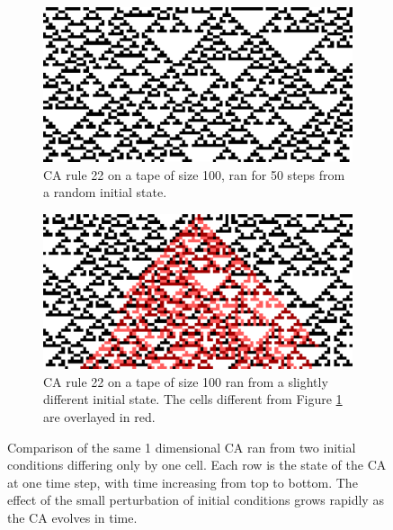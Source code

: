 \begin{figure}[htbp]
\begin{subfigure}[t]{.04\linewidth}
    \caption*{}
  \end{subfigure}
  \begin{subfigure}[t]{.45\linewidth}
    \centering
    \includegraphics[width=.93\linewidth]{figures/ca_comp_a}
    \caption{\ac{CA} rule 22 on a tape of size 100, ran for 50 steps from a
      random initial state.}
    \label{fig:ca_comp_a}
  \end{subfigure}
  \hspace{10pt}
  \begin{subfigure}[t]{.45\linewidth}
    \centering
    \includegraphics[width=.93\linewidth]{figures/ca_comp_b}
    \caption{\ac{CA} rule 22 on a tape of size 100 ran from a slightly
      different initial state. The cells different from Figure \ref{fig:ca_comp_a} are
      overlayed in red.}
    \label{fig:ca_comp_b}
  \end{subfigure}

  \caption{Comparison of the same 1 dimensional \ac{CA} ran from two initial conditions
    differing only by one cell. Each row is the state of the \ac{CA} at one time
    step, with time increasing from top to bottom. The effect of the small perturbation 
    of initial conditions grows rapidly as the \ac{CA} evolves in time.}
  \label{fig:ca_comp}
\end{figure}



